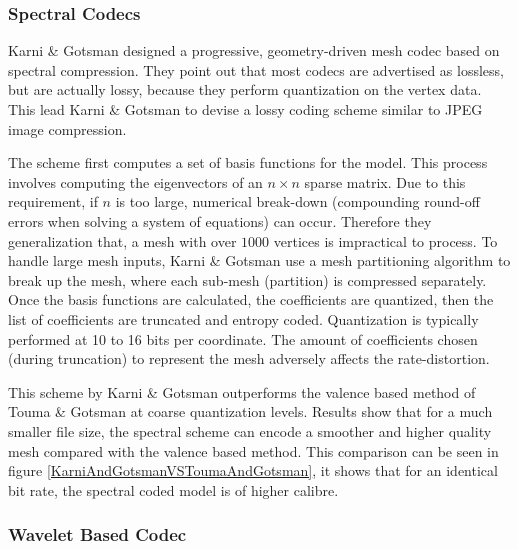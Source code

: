 \subsubsection{Spectral Codecs}

Karni \& Gotsman \cite{Karni00Spectral} designed a progressive, geometry-driven mesh codec based on spectral compression. They point out that most codecs are advertised as lossless, but are actually lossy, because they perform quantization on the vertex data. This lead Karni \& Gotsman to devise a lossy coding scheme similar to JPEG image compression. 

The scheme first computes a set of basis functions for the model. This process involves computing the eigenvectors of an $n\times n$ sparse matrix. Due to this requirement, if $n$ is too large, numerical break-down (compounding round-off errors when solving a system of equations) can occur. Therefore they generalization that, a mesh with over $1000$ vertices is impractical to process. To handle large mesh inputs, Karni \& Gotsman use a mesh partitioning algorithm to break up the mesh, where each sub-mesh (partition) is compressed separately. Once the basis functions are calculated, the coefficients are quantized, then the list of coefficients are truncated and entropy coded. Quantization is typically performed at 10 to 16 bits per coordinate. The amount of coefficients chosen (during truncation) to represent the mesh adversely affects the rate-distortion. 

This scheme by Karni \& Gotsman outperforms the valence based method of Touma \& Gotsman \cite{touma98triangle} at coarse quantization levels. Results show that for a much smaller file size, the spectral scheme can encode a smoother and higher quality mesh compared with the valence based method. This comparison can be seen in figure \ref{KarniAndGotsmanVSToumaAndGotsman}, it shows that for an identical bit rate, the spectral coded model is of higher calibre.




\subsubsection{Wavelet Based Codec}

